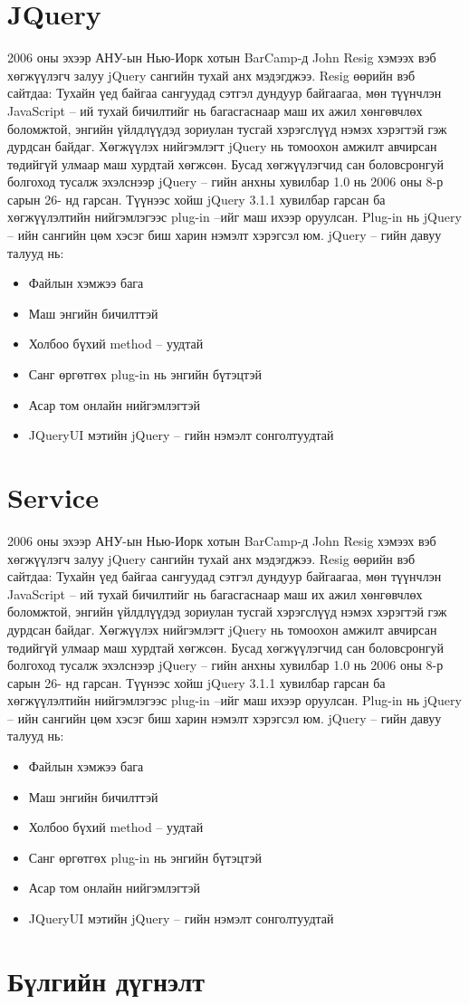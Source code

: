 \section{JQuery}
2006 оны эхээр АНУ-ын Нью-Иорк хотын BarCamp-д John Resig хэмээх вэб хөгжүүлэгч залуу jQuery сангийн тухай анх мэдэгджээ. Resig өөрийн вэб сайтдаа: Тухайн үед байгаа сангуудад сэтгэл дундуур байгаагаа, мөн түүнчлэн JavaScript – ий тухай бичилтийг нь багасгаснаар маш их ажил хөнгөвчлөх боломжтой, энгийн үйлдлүүдэд зориулан тусгай хэрэгслүүд нэмэх хэрэгтэй гэж дурдсан байдаг.
Хөгжүүлэх нийгэмлэгт jQuery нь томоохон амжилт авчирсан төдийгүй улмаар маш хурдтай хөгжсөн. Бусад хөгжүүлэгчид сан боловсронгуй болгоход тусалж эхэлснээр jQuery – гийн анхны хувилбар 1.0 нь 2006 оны 8-р сарын 26- нд гарсан.
Түүнээс хойш jQuery 3.1.1 хувилбар гарсан ба хөгжүүлэлтийн нийгэмлэгээс plug-in –ийг маш ихээр оруулсан. Plug-in нь jQuery – ийн сангийн цөм хэсэг биш харин нэмэлт хэрэгсэл юм. 
jQuery – гийн давуу талууд нь:
\begin{itemize}
\item Файлын хэмжээ бага
\item Маш энгийн бичилттэй
\item Холбоо бүхий method – уудтай
\item Санг өргөтгөх plug-in нь энгийн бүтэцтэй
\item Асар том онлайн нийгэмлэгтэй
\item JQueryUI мэтийн jQuery – гийн нэмэлт сонголтуудтай
\end{itemize}
\section{Service}
2006 оны эхээр АНУ-ын Нью-Иорк хотын BarCamp-д John Resig хэмээх вэб хөгжүүлэгч залуу jQuery сангийн тухай анх мэдэгджээ. Resig өөрийн вэб сайтдаа: Тухайн үед байгаа сангуудад сэтгэл дундуур байгаагаа, мөн түүнчлэн JavaScript – ий тухай бичилтийг нь багасгаснаар маш их ажил хөнгөвчлөх боломжтой, энгийн үйлдлүүдэд зориулан тусгай хэрэгслүүд нэмэх хэрэгтэй гэж дурдсан байдаг.
Хөгжүүлэх нийгэмлэгт jQuery нь томоохон амжилт авчирсан төдийгүй улмаар маш хурдтай хөгжсөн. Бусад хөгжүүлэгчид сан боловсронгуй болгоход тусалж эхэлснээр jQuery – гийн анхны хувилбар 1.0 нь 2006 оны 8-р сарын 26- нд гарсан.
Түүнээс хойш jQuery 3.1.1 хувилбар гарсан ба хөгжүүлэлтийн нийгэмлэгээс plug-in –ийг маш ихээр оруулсан. Plug-in нь jQuery – ийн сангийн цөм хэсэг биш харин нэмэлт хэрэгсэл юм. 
jQuery – гийн давуу талууд нь:
\begin{itemize}
\item Файлын хэмжээ бага
\item Маш энгийн бичилттэй
\item Холбоо бүхий method – уудтай
\item Санг өргөтгөх plug-in нь энгийн бүтэцтэй
\item Асар том онлайн нийгэмлэгтэй
\item JQueryUI мэтийн jQuery – гийн нэмэлт сонголтуудтай
\end{itemize}
\section{Бүлгийн дүгнэлт}
